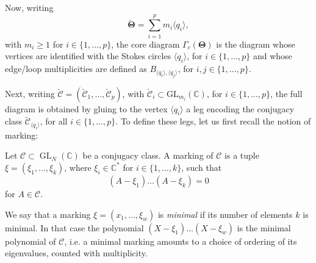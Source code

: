 \documentclass[11pt,a4paper]{amsart}
\numberwithin{equation}{section}
\DeclareMathOperator{\GL}{GL}
\newcommand{\cir}[1]{\langle #1 \rangle}
\begin{document}
Now, writing
\[
\bm{\breve\Theta}=\sum_{i=1}^p m_i\cir{q_i},
\]
with $m_i\geq 1$ for $i\in\{1, \dots, p\}$, the core diagram $\Gamma_c(\bm\Theta)$ is the diagram whose vertices are identified with the Stokes circles $\cir{q_i}$, for $i\in \{1, \dots, p\}$ and whose edge/loop multiplicities are defined as $B_{\cir{q_i}, \cir{q_j}}$, for $i,j\in \{1, \dots, p\}$.

Next, writing $\bm{\breve{\mathcal C}}=(\breve{\mathcal C}_1, \dots, \breve{\mathcal C}_p)$, with $\breve{\mathcal C}_i\subset\mathrm{GL}_{m_i}(\mathbb C)$, for $i\in \{1, \dots, p\}$, the full diagram is obtained by gluing to the vertex $\cir{q_i}$ a leg encoding the conjugacy class $\breve{\mathcal C}_{\cir{q_i}}$, for all $i\in \{1, \dots, p\}$. To define these legs, let us first recall the notion of marking:

\begin{definition}
Let $\mathcal C\subset\GL_N(\mathbb C)$ be a conjugacy class. 
A marking of $\mathcal C$ is a tuple $\xi=(\xi_1, \dots, \xi_k)$, where $\xi_i\in \mathbb C^*$ for $i\in \{1, \dots, k\}$, such that
\[
(A-\xi_1)\dots (A-\xi_k)=0
\]
for $A\in \mathcal C$.
\end{definition}


We say that a marking $\xi=(x_1, \dots, \xi_w)$ is \emph{minimal} if its number of elements $k$ is minimal. In that case the polynomial $(X-\xi_1)\dots(X-\xi_w)$ is the minimal polynomial of $\mathcal C$, i.e. a minimal marking amounts to a choice of ordering of its eigenvalues, counted with multiplicity.
\end{document}
